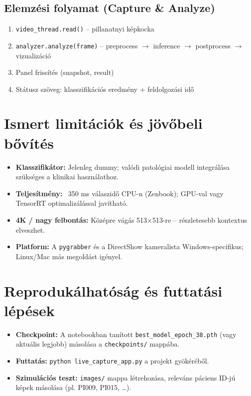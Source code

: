 \documentclass[12pt, a4paper]{report}
\begin{document}
\subsection{Elemzési folyamat (Capture \& Analyze)}
\begin{enumerate}
    \item \texttt{video\_thread.read()} – pillanatnyi képkocka
    \item \texttt{analyzer.analyze(frame)} – preprocess $\rightarrow$ inference $\rightarrow$ postprocess $\rightarrow$ vizualizáció
    \item Panel frissítés (snapshot, result)
    \item Státusz szöveg: klasszifikációs eredmény + feldolgozási idő
\end{enumerate}

\section{Ismert limitációk és jövőbeli bővítés}

\begin{itemize}
    \item \textbf{Klasszifikátor:} Jelenleg dummy; valódi patológiai modell integrálása szükséges a klinikai használathoz.
    \item \textbf{Teljesítmény:} ~350 ms válaszidő CPU-n (Zenbook); GPU-val vagy TensorRT optimalizálással javítható.
    \item \textbf{4K / nagy felbontás:} Középre vágás 513×513-re – részletesebb kontextus elveszhet.
    \item \textbf{Platform:} A \texttt{pygrabber} és a DirectShow kameralista Windows-specifikus; Linux/Mac más megoldást igényel.
\end{itemize}

\section{Reprodukálhatóság és futtatási lépések}

\begin{itemize}
    \item \textbf{Checkpoint:} A notebookban tanított \texttt{best\_model\_epoch\_38.pth} (vagy aktuális legjobb) másolása a \texttt{checkpoints/} mappába.
    \item \textbf{Futtatás:} \texttt{python live\_capture\_app.py} a projekt gyökéréből.
    \item \textbf{Szimulációs teszt:} \texttt{images/} mappa létrehozása, releváns páciens ID-jú képek másolása (pl. PI009, PI015, …).
\end{itemize}
\end{document}

